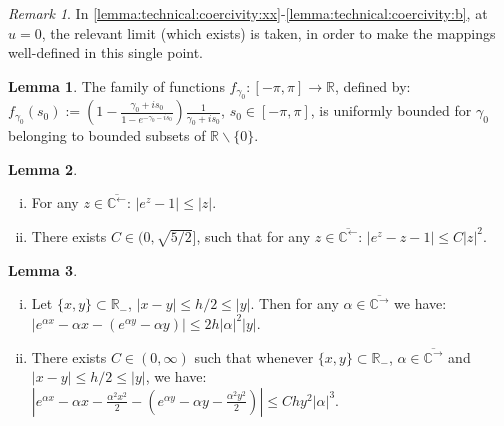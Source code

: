 \documentclass[pdftex,oneside,11pt,reqno]{amsart}
\theoremstyle{definition}
\theoremstyle{theorem}
\newtheorem{lemma}{Lemma}[section]
\theoremstyle{remark}
\newtheorem{remark}{Remark}[section]
\numberwithin{equation}{section}
\numberwithin{definition}{section}
\begin{document}
\begin{remark}
In \ref{lemma:technical:coercivity:xx}-\ref{lemma:technical:coercivity:b}, at $u=0$, the relevant limit (which exists) is taken, in order to make the mappings well-defined in this single point.
\end{remark}

\begin{lemma}\label{lemma:convergence:a_uniformly_bounded_family}
The family of functions $f_{\gamma_0}:[-\pi,\pi]\to\mathbb{R}$, defined by: $f_{\gamma_0}(s_0):=\left(1-\frac{\gamma_0+is_0}{1-e^{-\gamma_0-is_0}}\right)\frac{1}{\gamma_0+is_0}$, $s_0\in [-\pi,\pi]$, is uniformly bounded for $\gamma_0$ belonging to bounded subsets of $\mathbb{R}\backslash \{0\}$. 
\end{lemma}

\begin{lemma}\label{lemma:fundamental:inequalities}
\begin{enumerate}[(i)]
\item\label{lemma:technical:3rdorder:i} For any $z\in {\overline{\mathbb{C}^{\leftarrow}}}$: $\vert e^z-1\vert\leq \vert z\vert$.
\item\label{lemma:technical:3rdorder:ii} There exists $C\in (0,\sqrt{5/2}]$, such that for any $z\in {\overline{\mathbb{C}^{\leftarrow}}}$: $\vert e^z-z-1\vert\leq C\vert z\vert^2$.
\end{enumerate}
\label{lemma:technical:3rdorder}
\end{lemma}

\begin{lemma}\label{lemma:technical:2ndorder}
\begin{enumerate}[(i)]
\item\label{lemma:technical:2ndorder:i} Let $\{x,y\}\subset \mathbb{R}_-$, $\vert x-y\vert\leq h/2\leq \vert y\vert$. Then for any $\alpha\in{\overline{\mathbb{C}^{\rightarrow}}}$ we have: $\left\vert e^{\alpha x}-\alpha x-(e^{\alpha y}-\alpha y)\right\vert\leq 2 h \vert\alpha\vert^2\vert y\vert$.
\item\label{lemma:technical:2ndorder:ii} There exists $C\in (0,\infty)$ such that whenever $\{x,y\}\subset \mathbb{R}_-$, $\alpha\in{\overline{\mathbb{C}^{\rightarrow}}}$ and $\vert x-y\vert\leq h/2\leq \vert y\vert$, we have: $\left\vert e^{\alpha x}-\alpha x-\frac{\alpha^2x^2}{2}-\left(e^{\alpha y}-\alpha y-\frac{\alpha^2y^2}{2}\right)\right\vert\leq C hy^2\vert \alpha\vert^3$.
\end{enumerate}
\end{lemma}
\end{document}
